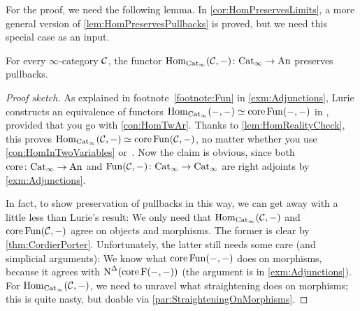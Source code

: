 For the proof, we need the following lemma. In \cref{cor:HomPreservesLimits}, a more general version of \cref{lem:HomPreservesPullbacks} is proved, but we need this special case as an input.
\begin{lem}\label{lem:HomPreservesPullbacks}
	For every $\infty$-category $\mathcal{C}$, the functor $\operatorname{Hom}_{\mathrm{Cat}_\infty}(\mathcal{C},-)\colon \mathrm{Cat}_\infty\rightarrow \mathrm{An}$ preserves pullbacks.
\end{lem}
\begin{proof}[Proof sketch]
	As explained in footnote~\cref{footnote:Fun} in \cref{exm:Adjunctions}, Lurie constructs an equivalence of functors $\operatorname{Hom}_{\mathrm{Cat}_\infty}(-,-)\simeq \operatorname{core}\operatorname{Fun}(-,-)$ in \cite[Proposition~]{HA}, provided that you go with \cref{con:HomTwAr}. Thanks to \cref{lem:HomRealityCheck}, this proves $\operatorname{Hom}_{\mathrm{Cat}_\infty}(\mathcal{C},-)\simeq \operatorname{core}\operatorname{Fun}(\mathcal{C},-)$, no matter whether you use \cref{con:HomInTwoVariables} or~. Now the claim is obvious, since both $\operatorname{core}\colon \mathrm{Cat}_\infty\rightarrow \mathrm{An}$ and $\operatorname{Fun}(\mathcal{C},-)\colon \mathrm{Cat}_\infty\rightarrow\mathrm{Cat}_\infty$ are right adjoints by \cref{exm:Adjunctions}.
	
	In fact, to show preservation of pullbacks in this way, we can get away with a little less than Lurie's result: We only need that $\operatorname{Hom}_{\mathrm{Cat}_\infty}(\mathcal{C},-)$ and  $\operatorname{core}\operatorname{Fun}(\mathcal{C},-)$ agree on objects and morphisms. The former is clear by \cref{thm:CordierPorter}. Unfortunately, the latter still needs some care (and simplicial arguments): We know what $\operatorname{core} \operatorname{Fun}(-,-)$ does on morphisms, because it agrees with $\operatorname{N}^\Delta(\operatorname{core}\operatorname{F}(-,-))$ (the argument is in \cref{exm:Adjunctions}). For $\operatorname{Hom}_{\mathrm{Cat}_\infty}(\mathcal{C},-)$, we need to unravel what straightening does on morphisms; this is quite nasty, but doable via \cref{par:StraighteningOnMorphisms}.
\end{proof}
